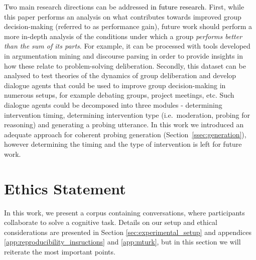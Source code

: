 \documentclass[acmsmall,manuscript,screen]{acmart}
\newcommand\newtext[1]{\textcolor{black}{#1}}
\begin{document}
Two main research directions can be addressed \newtext{in future research}. First, while this paper performs an analysis on what contributes towards improved group decision-making (referred to as performance gain), future work should perform a more in-depth analysis of the conditions under which a group \textit{performs better than the sum of its parts}. For example, it can be processed with tools developed in argumentation mining \cite{Zhang2022EnhancingLA} and discourse parsing \cite{Liu2021ImprovingMD} in order to provide insights in how these relate to problem-solving deliberation. Secondly, this dataset can be analysed to test theories of the dynamics of group deliberation and develop 
 dialogue agents that could be used to improve group decision-making in numerous setups, for example debating groups, project meetings, etc. Such dialogue agents could be decomposed into three modules - determining intervention timing,
determining intervention type (i.e.\ moderation, probing for reasoning) and generating a probing utterance. In this work we introduced an adequate approach for coherent probing generation (Section~\ref{ssec:generation}), however determining the timing and the type of intervention is left for future work.

















\section{Ethics Statement}
In this work, we present a corpus containing conversations, where participants collaborate to solve a cognitive task. Details on our setup and ethical considerations are presented in Section \ref{sec:experimental_setup} and appendices \ref{app:reproducibility_insructions} and \ref{app:mturk}, but in this section we will reiterate  the most important points.
\end{document}
